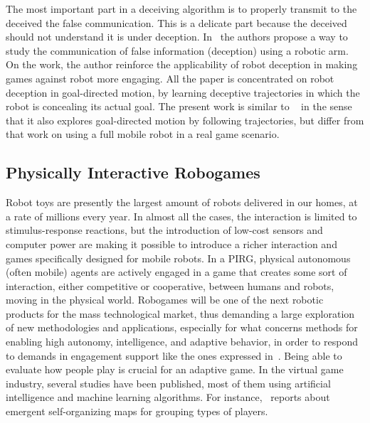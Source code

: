 The most important part in a deceiving algorithm is to properly transmit to the deceived the false communication. This is a delicate part because the deceived should not understand it is under deception. 
In~\cite{dragan_analysis_2014} the authors propose a way to study the communication of false information (deception) using a robotic arm. On the work, the author reinforce the applicability of robot deception in making games against robot more engaging. All the paper is concentrated on robot deception in goal-directed motion, by learning deceptive trajectories in which the robot is concealing its actual goal. The present work is similar to ~\cite{dragan_analysis_2014} in the sense that it also explores goal-directed motion by following trajectories, but differ from that work on using a full mobile robot in a real game scenario. 



\subsection{Physically Interactive Robogames}

Robot toys are presently the largest amount of robots delivered in our homes, at a rate of millions every year. In almost all the cases, the interaction is limited to stimulus-response reactions, but the introduction of low-cost sensors and computer power are making it possible to introduce a richer interaction and games specifically designed for mobile robots. In a PIRG, physical autonomous (often mobile) agents are actively engaged in a game that creates some sort of interaction, either competitive or cooperative, between humans and robots, moving in the physical world. Robogames will be one of the next robotic products for the mass technological market, thus demanding a large exploration of new methodologies and applications, especially for what concerns methods for enabling high autonomy, intelligence, and adaptive behavior, in order to respond to demands in engagement support like the ones expressed in~\cite{yannakakis_entertainment_2008,yannakakis_how_2008,yannakakis_real-time_2009}. 
Being able to evaluate how people play is crucial for an adaptive game. In the virtual game industry, several studies have been published, most of them using artificial intelligence and machine learning algorithms. For instance,~\cite{drachen_player_2009} reports about emergent self-organizing maps for grouping types of players. 

